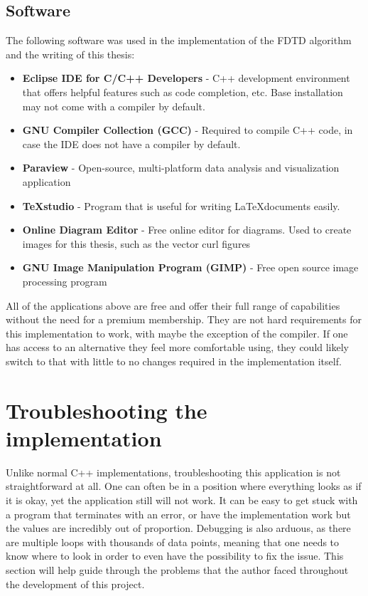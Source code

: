 \subsection{Software}
The following software was used in the implementation of the FDTD algorithm and the writing of this thesis:

\begin{itemize}
	\item \textbf{Eclipse IDE for C/C++ Developers\textsuperscript{\cite{eclipse}}} - C++ development environment that offers helpful features such as code completion, etc. Base installation may not come with a compiler by default.
	\item \textbf{GNU Compiler Collection (GCC)\textsuperscript{\cite{gcc}}} - Required to compile C++ code, in case the IDE does not have a compiler by default.
	\item \textbf{Paraview\textsuperscript{\cite{paraview}}} - Open-source, multi-platform data analysis and visualization application
	\item \textbf{TeXstudio\textsuperscript{\cite{texstudio}}} - Program that is useful for writing \LaTeX documents easily.
	\item \textbf{Online Diagram Editor\textsuperscript{\cite{diagrameditor}}} - Free online editor for diagrams. Used to create images for this thesis, such as the vector curl figures
	\item \textbf{GNU Image Manipulation Program (GIMP)\textsuperscript{\cite{gimp}}} - Free open source image processing program
\end{itemize}

All of the applications above are free and offer their full range of capabilities without the need for a premium membership. They are not hard requirements for this implementation to work, with maybe the exception of the compiler. If one has access to an alternative they feel more comfortable using, they could likely switch to that with little to no changes required in the implementation itself. 


\section{Troubleshooting the implementation}

Unlike normal C++ implementations, troubleshooting this application is not straightforward at all. One can often be in a position where everything looks as if it is okay, yet the application still will not work. It can be easy to get stuck with a program that terminates with an error, or have the implementation work but the values are incredibly out of proportion. Debugging is also arduous, as there are multiple loops with thousands of data points, meaning that one needs to know where to look in order to even have the possibility to fix the issue. This section will help guide through the problems that the author faced throughout the development of this project.

